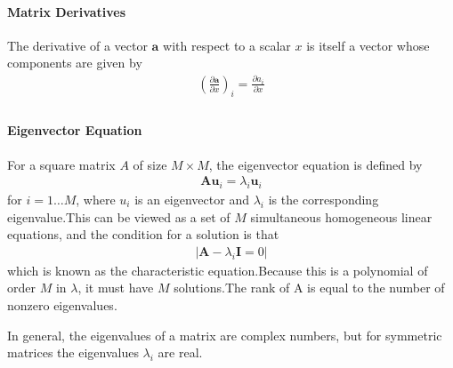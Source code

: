 \documentclass[a4paper]{article}
\begin{document}
\paragraph{Matrix Derivatives}
The derivative of a vector $\mathbf{a}$ with respect to a scalar $x$ is itself a
vector whose components are given by
\begin{align}
(\frac{\partial\mathbf{a}}{\partial x})_i = \frac{\partial
  a_i}{\partial x}\\
\end{align}

\paragraph{Eigenvector Equation}
For a square matrix $A$ of size $M \times M$, the eigenvector equation is defined by
\begin{align}
\mathbf{A}\mathbf{u}_i = \lambda_i\mathbf{u}_i
\end{align}
for $i = 1 \dotsc M$, where $u_i$ is an eigenvector and $\lambda_i$ is
the corresponding eigenvalue.This can be viewed as a set of $M$
simultaneous homogeneous linear equations, and the condition for a solution is that
\begin{align}
|\mathbf{A} - \lambda_i\mathbf{I} = 0|
\end{align}
which is known as the characteristic equation.Because this is a
polynomial of order $M$ in $\lambda$, it must have $M$ solutions.The rank
of A is equal to the number of nonzero eigenvalues.

In general, the eigenvalues of a matrix are complex numbers, but for
symmetric matrices the eigenvalues $\lambda_i$ are real.
\end{document}
